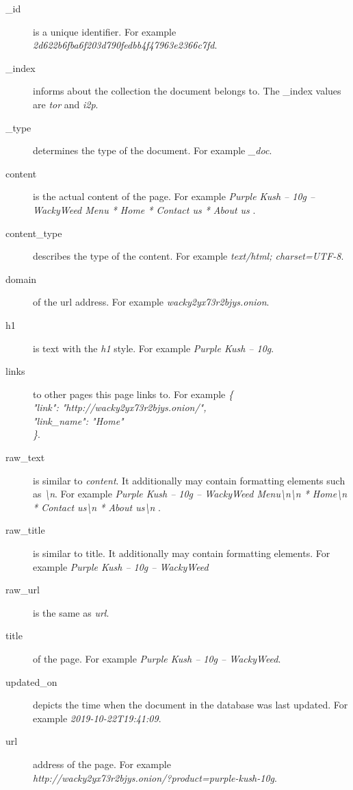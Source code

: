 \begin {description}
	\item[\_id \label{DWDataList}] is a unique identifier. For example\\ \textit{2d622b6fba6f203d790fedbb4f47963e2366c7fd}.
	\item[\_index] informs about the collection the document belongs to. The \_index values are \textit{tor} and \textit{i2p}. 
	\item[\_type] determines the type of the document. For example \textit{\_doc}.
	\item[content] is the actual content of the page. For example \textit{Purple Kush – 10g – WackyWeed Menu    * Home   * Contact us   * About us }.
	\item[content\_type] describes the type of the content. For example \textit{text/html; charset=UTF-8}.
	\item[domain] of the url address. For example \textit{wacky2yx73r2bjys.onion}.
	\item[h1] is text with the \textit{h1} style. For example \textit{Purple Kush – 10g}.
	\item[links] to other pages this page links to. For example \textit{\{\\
  "link": "http://wacky2yx73r2bjys.onion/",\\
  "link\_name": "Home"\\
\}}.
	\item[raw\_text] is similar to \textit{content}. It additionally may contain formatting elements such as \textit{\textbackslash n}. For example \textit{Purple Kush – 10g – WackyWeed Menu\textbackslash n\textbackslash n  * Home\textbackslash n  * Contact us\textbackslash n  * About us\textbackslash n }.
	\item[raw\_title] is similar to title. It additionally may contain formatting elements. For example \textit{Purple Kush – 10g – WackyWeed}
	\item[raw\_url] is the same as \textit{url}.
	\item[title] of the page. For example \textit{Purple Kush – 10g – WackyWeed}.
	\item[updated\_on] depicts the time when the document in the database was last updated. For example \textit{2019-10-22T19:41:09}.
	\item[url] address of the page. For example \\ \textit{http://wacky2yx73r2bjys.onion/?product=purple-kush-10g}.
\end{description}


